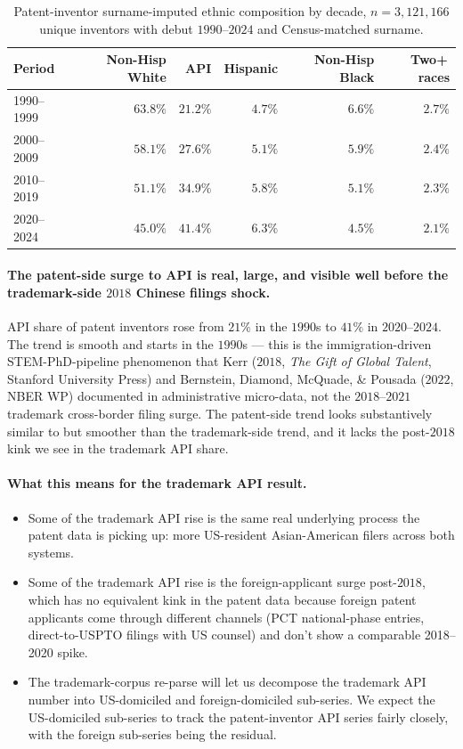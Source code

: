 \documentclass[11pt]{article}
\begin{document}
\begin{table}[h]
\centering
\small
\begin{tabular}{lrrrrr}
\toprule
Period & Non-Hisp White & API & Hispanic & Non-Hisp Black & Two+\,races \\
\midrule
1990--1999 & $63.8\%$ & $21.2\%$ & $4.7\%$ & $6.6\%$ & $2.7\%$ \\
2000--2009 & $58.1\%$ & $27.6\%$ & $5.1\%$ & $5.9\%$ & $2.4\%$ \\
2010--2019 & $51.1\%$ & $34.9\%$ & $5.8\%$ & $5.1\%$ & $2.3\%$ \\
2020--2024 & $45.0\%$ & $41.4\%$ & $6.3\%$ & $4.5\%$ & $2.1\%$ \\
\bottomrule
\end{tabular}
\caption{Patent-inventor surname-imputed ethnic composition by decade,
$n = 3{,}121{,}166$ unique inventors with debut $1990$--$2024$ and
Census-matched surname.}
\label{tab:patent-comp}
\end{table}

\paragraph{The patent-side surge to API is real, large, and visible
well before the trademark-side $2018$ Chinese filings shock.} API
share of patent inventors rose from $21\%$ in the $1990$s to $41\%$
in $2020$--$2024$. The trend is smooth and starts in the $1990$s ---
this is the immigration-driven STEM-PhD-pipeline phenomenon that
Kerr ($2018$, \emph{The Gift of Global Talent}, Stanford University
Press) and Bernstein, Diamond, McQuade, \& Pousada ($2022$, NBER WP)
documented in administrative micro-data, not the
$2018$--$2021$ trademark cross-border filing surge. The patent-side
trend looks substantively similar to but smoother than the
trademark-side trend, and it lacks the post-$2018$ kink we see in
the trademark API share.

\paragraph{What this means for the trademark API result.}
\begin{itemize}\setlength\itemsep{2pt}
\item Some of the trademark API rise is the same real underlying
process the patent data is picking up: more US-resident
Asian-American filers across both systems.
\item Some of the trademark API rise is the foreign-applicant surge
post-$2018$, which has no equivalent kink in the patent data because
foreign patent applicants come through different channels (PCT
national-phase entries, direct-to-USPTO filings with US counsel)
and don't show a comparable 2018--2020 spike.
\item The trademark-corpus re-parse will let us decompose the
trademark API number into US-domiciled and foreign-domiciled
sub-series. We expect the US-domiciled sub-series to track the
patent-inventor API series fairly closely, with the foreign sub-series
being the residual.
\end{itemize}
\end{document}
